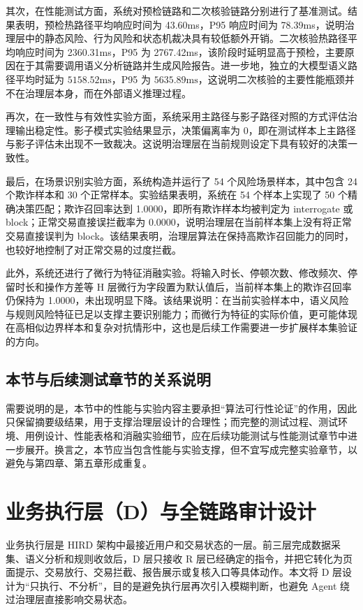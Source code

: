 \documentclass{xduugthesis}
\begin{document}
其次，在性能测试方面，系统对预检链路和二次核验链路分别进行了基准测试。结果表明，预检热路径平均响应时间为 43.60ms，P95 响应时间为 78.39ms，说明治理层中的静态风险、行为风险和状态机裁决具有较低额外开销。二次核验热路径平均响应时间为 2360.31ms，P95 为 2767.42ms，该阶段时延明显高于预检，主要原因在于其需要调用语义分析链路并生成风险报告。进一步地，独立的大模型语义路径平均时延为 $5158.52\mathrm{ms}$，P95 为 $5635.89\mathrm{ms}$，这说明二次核验的主要性能瓶颈并不在治理层本身，而在外部语义推理过程。

再次，在一致性与有效性实验方面，系统采用主路径与影子路径对照的方式评估治理输出稳定性。影子模式实验结果显示，决策偏离率为 0，即在测试样本上主路径与影子评估未出现不一致裁决。这说明治理层在当前规则设定下具有较好的决策一致性。

最后，在场景识别实验方面，系统构造并运行了 54 个风险场景样本，其中包含 24 个欺诈样本和 30 个正常样本。实验结果表明，系统在 54 个样本上实现了 50 个精确决策匹配；欺诈召回率达到 1.0000，即所有欺诈样本均被判定为 interrogate 或 block；正常交易直接误拦截率为 0.0000，说明治理层在当前样本集上没有将正常交易直接误判为 block。该结果表明，治理层算法在保持高欺诈召回能力的同时，也较好地控制了对正常交易的过度拦截。

此外，系统还进行了微行为特征消融实验。将输入时长、停顿次数、修改频次、停留时长和操作方差等 H 层微行为字段置为默认值后，当前样本集上的欺诈召回率仍保持为 1.0000，未出现明显下降。该结果说明：在当前实验样本中，语义风险与规则风险特征已足以支撑主要识别能力；而微行为特征的实际价值，更可能体现在高相似边界样本和复杂对抗情形中，这也是后续工作需要进一步扩展样本集验证的方向。

\subsection{本节与后续测试章节的关系说明}

需要说明的是，本节中的性能与实验内容主要承担“算法可行性论证”的作用，因此只保留摘要级结果，用于支撑治理层设计的合理性；而完整的测试过程、测试环境、用例设计、性能表格和消融实验细节，应在后续功能测试与性能测试章节中进一步展开。换言之，本节应当包含性能与实验支撑，但不宜写成完整实验章节，以避免与第四章、第五章形成重复。

\section{业务执行层（D）与全链路审计设计}

业务执行层是 HIRD 架构中最接近用户和交易状态的一层。前三层完成数据采集、语义分析和规则收敛后，D 层只接收 R 层已经确定的指令，并把它转化为页面提示、交易放行、交易拦截、报告展示或复核入口等具体动作。本文将 D 层设计为“只执行、不分析”，目的是避免执行层再次引入模糊判断，也避免 Agent 绕过治理层直接影响交易状态。
\end{document}

